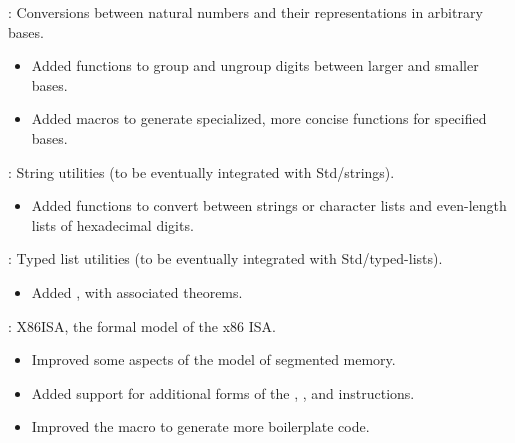 \begin{frame}

\implibtitle

:
Conversions between natural numbers
and their representations in arbitrary bases.
\begin{itemize}
\item
Added functions to group and ungroup digits between larger and smaller bases.
\item
Added macros to generate specialized, more concise functions
for specified bases.
\end{itemize}

\separation

:
String utilities (to be eventually integrated with Std/strings).
\begin{itemize}
\item
Added functions to convert between strings or character lists
and even-length lists of hexadecimal digits.
\end{itemize}

\separation

:
Typed list utilities (to be eventually integrated with Std/typed-lists).
\begin{itemize}
\item
Added , with associated theorems.
\end{itemize}

\end{frame}


\begin{frame}

\implibtitle

:
X86ISA, the formal model of the x86 ISA.
\begin{itemize}
\item
Improved some aspects of the model of segmented memory.
\item
Added support for additional forms of the
, , and  instructions.
\item
Improved the  macro to generate more boilerplate code.
\end{itemize}

\end{frame}


